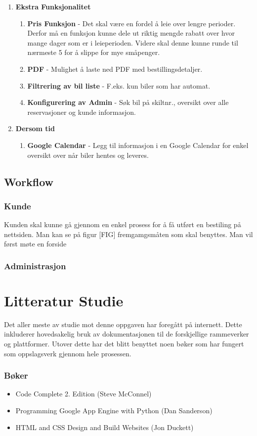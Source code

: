 \begin{enumerate}
  \item \textbf{Ekstra Funksjonalitet}
	\begin{enumerate}
		\item \textbf{Pris Funksjon} - Det skal være en fordel å leie over lengre perioder. Derfor må en funksjon kunne dele ut riktig mengde rabatt over hvor mange dager som er i leieperioden. Videre skal denne kunne runde til nærmeste 5 for å slippe for mye småpenger.
		\item \textbf{PDF} - Mulighet å laste ned PDF med bestillingsdetaljer.
		\item \textbf{Filtrering av bil liste} - F.eks. kun biler som har automat. 
		\item \textbf{Konfigurering av Admin} - Søk bil på skiltnr., oversikt over alle reservasjoner og kunde informasjon.
	\end{enumerate}
  \item \textbf{Dersom tid}
  	\begin{enumerate}
  	\item \textbf{Google Calendar} - Legg til informasjon i en Google Calendar for enkel oversikt over når biler hentes og leveres.
  	\end{enumerate}
 
 \end{enumerate}

\subsection{Workflow}
\subsubsection{Kunde}
Kunden skal kunne gå gjennom en enkel prosess for å få utført en bestiling på nettsiden. Man kan se på figur [FIG] fremgamgsmåten som skal benyttes. Man vil først møte en forside 
\subsubsection{Administrasjon}


\section{Litteratur Studie}
Det aller meste av studie mot denne oppgaven har foregått på internett. Dette inkluderer hovedsakelig bruk av dokumentasjonen til de forskjellige rammeverker og plattformer. Utover dette har det blitt benyttet noen bøker som har fungert som oppslagsverk gjennom hele prosessen.

\subsubsection*{Bøker}
\begin{itemize}
\item Code Complete 2. Edition (Steve McConnel)
\item Programming Google App Engine with Python (Dan Sanderson)
\item HTML and CSS Design and Build Websites (Jon Duckett)
\end{itemize}
\newpage